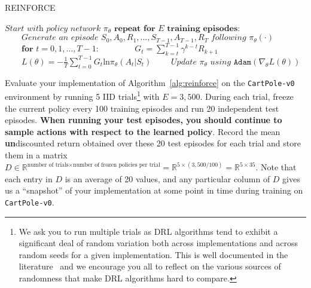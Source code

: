 \documentclass[12pt]{article}
\begin{document}

\begin{algorithm}
\caption{REINFORCE\label{alg:reinforce}}
\begin{algorithmic}[1]
\State $\textit{Start with policy network } \pi_\theta $
\State $\textbf{repeat for $E$ training episodes:}$
\State $\qquad\textit{Generate an episode } S_0, A_0, R_1, \ldots, S_{T-1}, A_{T-1}, R_{T} \textit{ following } \pi_\theta(\cdot)$
\State $\qquad\textbf{for } t = 0 , 1 , \dots , T -1$: \label{line:reinforce:1}
\State $\qquad\qquad G_t = \sum_{k=t}^{T-1}\gamma^{k-t}R_{k+1}$ \label{line:reinforce:2}
\State $\qquad L(\theta) = -\frac{1}{T} \sum_{t=0}^{T-1} G_t \text{ln} \pi_\theta(A_t | S_t)$
\State $\qquad\textit{Update $\pi_\theta$ using } \texttt{Adam}\left(\nabla_\theta L(\theta)\right)$

\EndProcedure
\end{algorithmic}
\label{alg:REINFORCE}
\end{algorithm}

Evaluate your implementation of Algorithm~\ref{alg:reinforce} on the \texttt{CartPole-v0} environment by running 5 IID trials\footnote{We ask you to run multiple trials as DRL algorithms tend to exhibit a significant deal of random variation both across implementations and across random seeds for a given implementation. This is well documented in the literature~\cite{colas2018many} and we encourage you all to reflect on the various sources of randomness that make DRL algorithms hard to compare.} with $E=3,500$. During each trial, freeze the current policy every 100 training episodes and run 20 independent test episodes. \textbf{When running your test episodes, you should continue to sample actions with respect to the learned policy}. Record the mean \textbf{un}discounted return obtained over these 20 test episodes for each trial and store them in a matrix $D\in \mathbb{R}^{\text{number of trials} \times \text{number of frozen policies per trial}} =\mathbb{R}^{5 \times (3,500 / 100)} = \mathbb{R}^{5 \times 35}$. Note that each entry in $D$ is an average of 20 values, and any particular column of $D$ gives us a ``snapshot'' of your implementation at some point in time during training on \texttt{CartPole-v0}.
\end{document}
